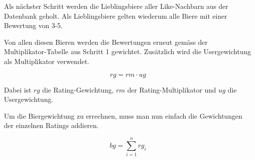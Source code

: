 \documentclass[10pt,a4paper]{scrartcl}
\begin{document}
Als nächster Schritt werden die Lieblingsbiere aller Like-Nachbarn aus der Datenbank geholt. Als
Lieblingsbiere gelten wiederum alle Biere mit einer Bewertung von 3-5.

Von allen diesen Bieren werden die Bewertungen erneut gemäss der Multiplikator-Tabelle aus Schritt
1 gewichtet. Zusätzlich wird die Usergewichtung als Multiplikator verwendet.

$$rg = rm \cdot ug$$

Dabei ist $rg$ die Rating-Gewichtung, $rm$ der Rating-Multiplikator und $ug$ die Usergewichtung.

Um die Biergewichtung zu errechnen, muss man nun einfach die Gewichtungen der einzelnen Ratings
addieren.

$$bg = \sum_{i=1}^n rg_i$$
\end{document}
